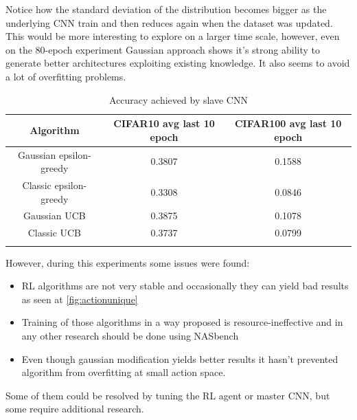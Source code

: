 Notice how the standard deviation of the distribution becomes bigger as the underlying CNN train and then reduces again when the dataset was updated. This would be more interesting to explore on a larger time scale, however, even on the 80-epoch experiment Gaussian approach shows it's strong ability to generate better architectures exploiting existing knowledge. It also seems to avoid a lot of overfitting problems.

\begin{table}[h!]
\centering
\begin{tabular}{c c c} 
 \hline
 Algorithm & CIFAR10 avg last 10 epoch & CIFAR100 avg last 10 epoch \\ [0.5ex] 
 \hline
 Gaussian epsilon-greedy & 0.3807 & 0.1588\\
 \hline
 Classic epsilon-greedy & 0.3308 & 0.0846 \\
 \hline
 Gaussian UCB & 0.3875 & 0.1078\\
 \hline
 Classic UCB & 0.3737 & 0.0799\\
 \hline \\ [0.5ex]
\end{tabular}
\caption{Accuracy achieved by slave CNN}
\label{table:5}
\end{table}

However, during this experiments some issues were found:

\begin{itemize}
\item{RL algorithms are not very stable and occasionally they can yield bad results as seen at \ref{fig:actionunique}}
\item{Training of those algorithms in a way proposed is resource-ineffective and in any other research should be done using NASbench \cite[see]{pmlr-v97-ying19a}}
\item{Even though gaussian modification yields better results it hasn't prevented algorithm from overfitting at small action space}.
\end{itemize}

Some of them could be resolved by tuning the RL agent or master CNN, but some require additional research.
